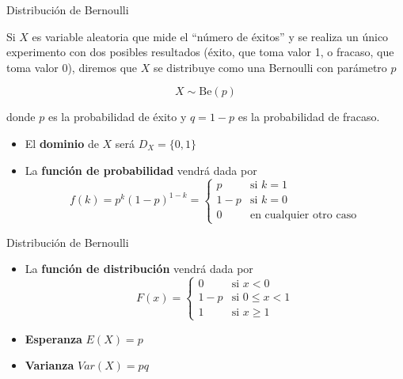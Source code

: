 \documentclass[
  ignorenonframetext,
]{beamer}
\providecommand{\tightlist}{%
  \setlength{\itemsep}{0pt}\setlength{\parskip}{0pt}}
\begin{document}
\begin{frame}{Distribución de Bernoulli}
\protect\hypertarget{distribuciuxf3n-de-bernoulli}{}

Si \(X\) es variable aleatoria que mide el ``número de éxitos'' y se
realiza un único experimento con dos posibles resultados (éxito, que
toma valor 1, o fracaso, que toma valor 0), diremos que \(X\) se
distribuye como una Bernoulli con parámetro \(p\)

\[X\sim \text{Be}(p)\]

donde \(p\) es la probabilidad de éxito y \(q = 1-p\) es la probabilidad
de fracaso.

\begin{itemize}
\tightlist
\item
  El \textbf{dominio} de \(X\) será \(D_X = \{0,1\}\)
\item
  La \textbf{función de probabilidad} vendrá dada por
  \[f(k) = p^k(1-p)^{1-k} =  \left\{
  \begin{array}{rl}
     p & \text{si } k=1 
  \\ 1-p & \text{si } k=0
  \\ 0 & \text{en cualquier otro caso}
  \end{array}
  \right.\]
\end{itemize}

\end{frame}

\begin{frame}{Distribución de Bernoulli}
\protect\hypertarget{distribuciuxf3n-de-bernoulli-1}{}

\begin{itemize}
\tightlist
\item
  La \textbf{función de distribución} vendrá dada por \[F(x) = \left\{
  \begin{array}{rl}
     0 & \text{si } x<0 
  \\ 1-p & \text{si } 0\le x<1
  \\ 1 & \text{si } x\ge 1
  \end{array}
  \right.\]
\item
  \textbf{Esperanza} \(E(X) = p\)
\item
  \textbf{Varianza} \(Var(X) = pq\)
\end{itemize}

\end{frame}
\end{document}
